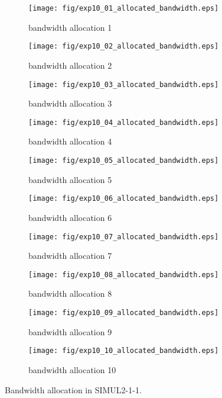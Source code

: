 \begin{figure}
	\begin{center}
		\begin{subfigure}[b]{0.32\textwidth}
			\texttt{[image: fig/exp10\_01\_allocated\_bandwidth.eps]}
			\caption{bandwidth allocation 1}
			\label{figure:simul2_1_1_b_a}
		\end{subfigure}
		\begin{subfigure}[b]{0.32\textwidth}
			\texttt{[image: fig/exp10\_02\_allocated\_bandwidth.eps]}
			\caption{bandwidth allocation 2}
			\label{figure:simul2_1_1_b_b}
		\end{subfigure}
		\begin{subfigure}[b]{0.32\textwidth}
			\texttt{[image: fig/exp10\_03\_allocated\_bandwidth.eps]}
			\caption{bandwidth allocation 3}
			\label{figure:simul2_1_1_b_c}
		\end{subfigure}
		\begin{subfigure}[b]{0.32\textwidth}
			\texttt{[image: fig/exp10\_04\_allocated\_bandwidth.eps]}
			\caption{bandwidth allocation 4}
			\label{figure:simul2_1_1_b_d}
		\end{subfigure}
		\begin{subfigure}[b]{0.32\textwidth}
			\texttt{[image: fig/exp10\_05\_allocated\_bandwidth.eps]}
			\caption{bandwidth allocation 5}
			\label{figure:simul2_1_1_b_e}
		\end{subfigure}
		\begin{subfigure}[b]{0.32\textwidth}
			\texttt{[image: fig/exp10\_06\_allocated\_bandwidth.eps]}
			\caption{bandwidth allocation 6}
			\label{figure:simul2_1_1_b_f}
		\end{subfigure}
		\begin{subfigure}[b]{0.32\textwidth}
			\texttt{[image: fig/exp10\_07\_allocated\_bandwidth.eps]}
			\caption{bandwidth allocation 7}
			\label{figure:simul2_1_1_b_g}
		\end{subfigure}
		\begin{subfigure}[b]{0.32\textwidth}
			\texttt{[image: fig/exp10\_08\_allocated\_bandwidth.eps]}
			\caption{bandwidth allocation 8}
			\label{figure:simul2_1_1_b_h}
		\end{subfigure}
		\begin{subfigure}[b]{0.32\textwidth}
			\texttt{[image: fig/exp10\_09\_allocated\_bandwidth.eps]}
			\caption{bandwidth allocation 9}
			\label{figure:simul2_1_1_b_i}
		\end{subfigure}
		\begin{subfigure}[b]{0.32\textwidth}
			\texttt{[image: fig/exp10\_10\_allocated\_bandwidth.eps]}
			\caption{bandwidth allocation 10}
			\label{figure:simul2_1_1_b_j}
		\end{subfigure}
		\caption{Bandwidth allocation in SIMUL2-1-1.}
		\label{figure:simul2_1_1_ba}
	\end{center}
\end{figure}

